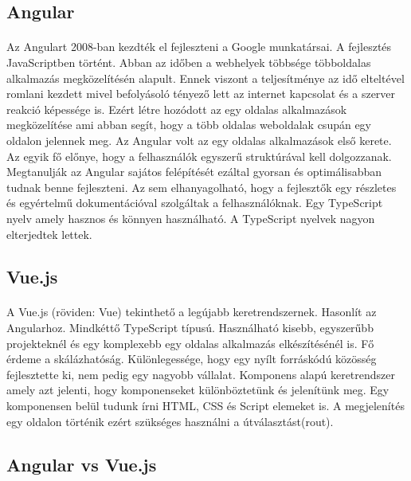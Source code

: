 	\subsection{Angular}
	\paragraph{}
	Az Angulart \cite{wohlgethan2018supportingweb} 2008-ban kezdték el fejleszteni a Google munkatársai. A fejlesztés JavaScriptben történt. Abban az időben a webhelyek többsége többoldalas alkalmazás megközelítésén alapult. Ennek viszont a teljesítménye az idő elteltével romlani kezdett mivel befolyásoló tényező lett az internet kapcsolat és a szerver reakció képessége is. Ezért létre hozódott az egy oldalas alkalmazások megközelítése ami abban segít, hogy a több oldalas weboldalak csupán egy oldalon jelennek meg. Az Angular volt az egy oldalas alkalmazások első kerete. Az egyik fő előnye, hogy a felhasználók egyszerű struktúrával kell dolgozzanak. Megtanulják az Angular sajátos felépítését ezáltal gyorsan és optimálisabban tudnak benne fejleszteni. Az sem elhanyagolható, hogy a fejlesztők egy részletes és egyértelmű dokumentációval szolgáltak a felhasználóknak. Egy TypeScript nyelv amely hasznos és könnyen használható. A TypeScript nyelvek nagyon elterjedtek lettek. 
	
	\subsection{Vue.js}
	\paragraph{}
	A Vue.js (röviden: Vue) \cite{wohlgethan2018supportingweb} tekinthető a legújabb keretrendszernek. Hasonlít az Angularhoz. Mindkéttő TypeScript típusú. Használható kisebb, egyszerűbb projekteknél és egy komplexebb egy oldalas alkalmazás elkészítésénél is. Fő érdeme a skálázhatóság. Különlegessége, hogy egy nyílt forráskódú közösség fejlesztette ki, nem pedig egy nagyobb vállalat. Komponens alapú keretrendszer amely azt jelenti, hogy komponenseket különböztetünk és jelenítünk meg. Egy komponensen belül tudunk írni HTML, CSS és Script elemeket is. A megjelenítés egy oldalon történik ezért szükséges használni a útválasztást(rout).
	
	\subsection{Angular vs Vue.js}
